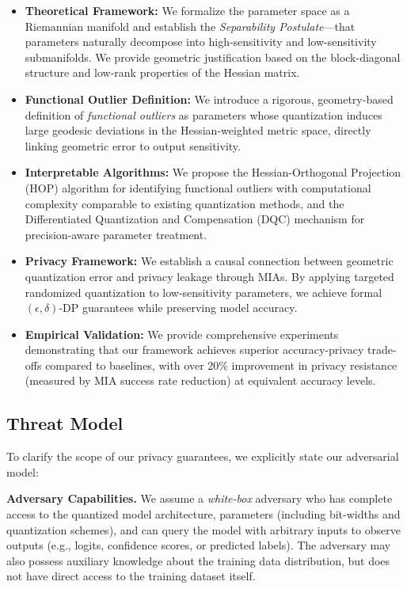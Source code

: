 \documentclass[letterpaper,twocolumn,10pt]{article}
\begin{document}
\begin{itemize}
\item \textbf{Theoretical Framework:} We formalize the parameter space as a Riemannian manifold and establish the \emph{Separability Postulate}---that parameters naturally decompose into high-sensitivity and low-sensitivity submanifolds. We provide geometric justification based on the block-diagonal structure and low-rank properties of the Hessian matrix.

\item \textbf{Functional Outlier Definition:} We introduce a rigorous, geometry-based definition of \emph{functional outliers} as parameters whose quantization induces large geodesic deviations in the Hessian-weighted metric space, directly linking geometric error to output sensitivity.

\item \textbf{Interpretable Algorithms:} We propose the Hessian-Orthogonal Projection (HOP) algorithm for identifying functional outliers with computational complexity comparable to existing quantization methods, and the Differentiated Quantization and Compensation (DQC) mechanism for precision-aware parameter treatment.

\item \textbf{Privacy Framework:} We establish a causal connection between geometric quantization error and privacy leakage through MIAs. By applying targeted randomized quantization to low-sensitivity parameters, we achieve formal $(\epsilon, \delta)$-DP guarantees while preserving model accuracy.

\item \textbf{Empirical Validation:} We provide comprehensive experiments demonstrating that our framework achieves superior accuracy-privacy trade-offs compared to baselines, with over 20\% improvement in privacy resistance (measured by MIA success rate reduction) at equivalent accuracy levels.
\end{itemize}

\subsection{Threat Model}
\label{sec:threat_model}

To clarify the scope of our privacy guarantees, we explicitly state our adversarial model:

\textbf{Adversary Capabilities.} We assume a \emph{white-box} adversary who has complete access to the quantized model architecture, parameters (including bit-widths and quantization schemes), and can query the model with arbitrary inputs to observe outputs (e.g., logits, confidence scores, or predicted labels). The adversary may also possess auxiliary knowledge about the training data distribution, but does not have direct access to the training dataset itself.
\end{document}
